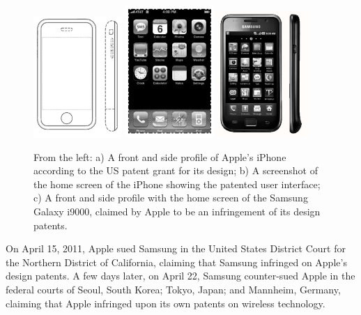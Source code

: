 \documentclass[prodmode,cs196]{acmlarge}
\begin{document}
\begin{figure}[H]
	\includegraphics[width=0.3\textwidth]{apple_iphone_shape.png}
	\includegraphics[width=0.3\textwidth]{apple_iphone_icons.png}
	\includegraphics[width=0.3\textwidth]{samsung-galaxy-i9000.png}
	\caption{From the left: a) A front and side profile of Apple's iPhone according to the US patent grant for its design; b) A screenshot of the home screen of the iPhone showing the patented user interface; c) A front and side profile with the home screen of the Samsung Galaxy i9000, claimed by Apple to be an infringement of its design patents. }
\end{figure}

On April 15, 2011, Apple sued Samsung in the United States District Court for the Northern District of California, claiming that Samsung infringed on Apple's design patents. A few days later, on April 22, Samsung counter-sued Apple in the federal courts of Seoul, South Korea; Tokyo, Japan; and Mannheim, Germany, claiming that Apple infringed upon its own patents on wireless technology.
\end{document}
